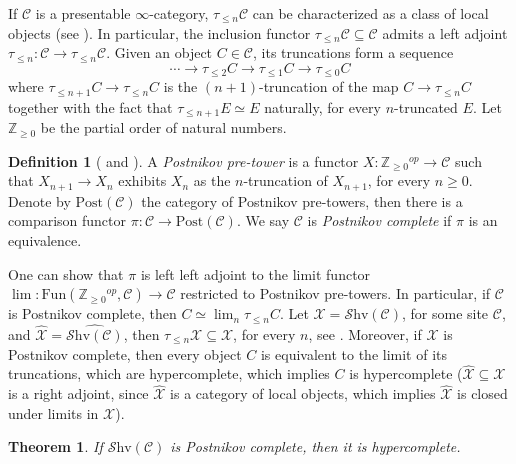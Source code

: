 \documentclass[10pt]{amsart}
\newcommand{\C}{\mathscr{C}}
\newcommand{\X}{\mathscr{X}}
\newcommand{\bZ}{\mathbb{Z}}
\newcommand{\Fun}{\mathrm{Fun}}
\newcommand{\Shv}{\mathscr{S}\mathrm{hv}}
\newcommand{\pos}{\mathrm{Post}}
\newtheorem{theorem}[equation]{Theorem}
\theoremstyle{definition}
\newtheorem{definition}[equation]{Definition}
\theoremstyle{remark}
\numberwithin{equation}{section}
\begin{document}
If $\C$ is a presentable $\infty$-category, $\tau_{\leq n}\C$ can be characterized as a class of local objects (see \cite[Proposition 5.5.6.18]{lurie2009htt}). In particular, the inclusion functor $\tau_{\leq n}\C\subseteq\C$ admits a left adjoint $\tau_{\leq n}:\C\to\tau_{\leq n}\C$. Given an object $C\in\C$, its truncations form a sequence 
\begin{equation}
	\cdots\to\tau_{\leq2}C\to\tau_{\leq1}C\to\tau_{\leq0}C
\end{equation}
where $\tau_{\leq n+1}C\to\tau_{\leq n}C$ is the $(n+1)$-truncation of the map $C\to\tau_{\leq n}C$ together with the fact that $\tau_{\leq n+1}E\simeq E$ naturally, for every $n$-truncated $E$. Let $\bZ_{\geq0}$ be the partial order of natural numbers. 
\begin{definition}[{\cite[Definition A.7.2.1]{lurie2018sag} and \cite[Definition 5.5.6.23]{lurie2009htt}}]
	A \emph{Postnikov pre-tower} is a functor $X:\bZ_{\geq0}{}^{op}\to\C$ such that $X_{n+1}\to X_n$ exhibits $X_n$ as the $n$-truncation of $X_{n+1}$, for every $n\geq0$. Denote by $\pos(\C)$ the category of Postnikov pre-towers, then there is a comparison functor $\pi:\C\to\pos(\C)$. We say $\C$ is \emph{Postnikov complete} if $\pi$ is an equivalence. 
\end{definition}One can show that $\pi$ is left left adjoint to the limit functor $\lim:\Fun(\bZ_{\geq0}{}^{op},\C)\to\C$ restricted to Postnikov pre-towers. In particular, if $\C$ is Postnikov complete, then $C\simeq\lim_n\tau_{\leq n}C$. Let $\X=\Shv(\C)$, for some site $\C$, and $\widehat{\X}=\widehat{\Shv(\C)}$, then $\tau_{\leq n}\X\subseteq\widehat{\X}$, for every $n$, see \cite[Lemma 6.5.2.9]{lurie2009htt}. Moreover, if $\X$ is Postnikov complete, then every object $C$ is equivalent to the limit of its truncations, which are hypercomplete, which implies $C$ is hypercomplete ($\widehat{\X}\subseteq\X$ is a right adjoint, since $\widehat{\X}$ is a category of local objects, which implies $\widehat{\X}$ is closed under limits in $\X$).
\begin{theorem}
	If $\Shv(\C)$ is Postnikov complete, then it is hypercomplete. 
\end{theorem} 


{\footnotesize


}
\end{document}
